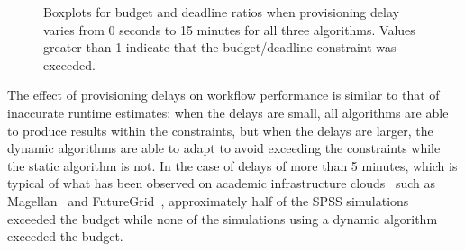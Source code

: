 \documentclass[conference]{IEEEtran}
\begin{document}
\begin{figure}[tb]
    \centering
    \hspace{2cm}
    \caption{Boxplots for budget and deadline ratios when provisioning delay 
    varies from 0 seconds to 15 minutes for all three algorithms. Values 
    greater than 1 indicate that the budget/deadline constraint was exceeded.}
    \label{fig:delays}
\end{figure}

The effect of provisioning delays on workflow performance is similar to that
of inaccurate runtime estimates: when the delays are small, all algorithms are
able to produce results within the constraints, but when the delays are
larger, the dynamic algorithms are able to adapt to avoid exceeding the
constraints while the static algorithm is not. In the case of delays of more
than 5 minutes, which is typical of what has been observed on academic
infrastructure clouds~\cite{Juve2011} such as Magellan~\cite{Magellan} and
FutureGrid~\cite{FutureGrid}, approximately half of the SPSS simulations
exceeded the budget while none of the simulations using a dynamic algorithm
exceeded the budget.
\end{document}
